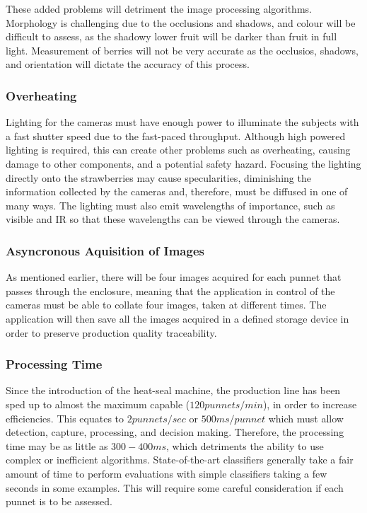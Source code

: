 \documentclass[fleqn,twoside]{article}
\begin{document}
These added problems will detriment the image processing algorithms. Morphology is challenging due to the occlusions and shadows, and colour will be difficult to assess, as the shadowy lower fruit will be darker than fruit in full light. Measurement of berries will not be very accurate as the occlusios, shadows, and orientation will dictate the accuracy of this process.



\subsubsection{Overheating}

Lighting for the cameras must have enough power to illuminate the subjects with a fast shutter speed due to the fast-paced throughput. Although high powered lighting is required, this can create other problems such as overheating, causing damage to other components, and a potential safety hazard. Focusing the lighting directly onto the strawberries may cause specularities, diminishing the information collected by the cameras and, therefore, must be diffused in one of many ways. The lighting must also emit wavelengths of importance, such as visible and IR so that these wavelengths can be viewed through the cameras. 

\subsubsection{Asyncronous Aquisition of Images}

As mentioned earlier, there will be four images acquired for each punnet that passes through the enclosure, meaning that the application in control of the cameras must be able to collate four images, taken at different times. The application will then save all the images acquired in a defined storage device in order to preserve production quality traceability.   

\subsubsection{Processing Time}

Since the introduction of the heat-seal machine, the production line has been sped up to almost the maximum capable ($120 punnets/min$), in order to increase efficiencies. This equates to $2 punnets/sec$ or $500ms/ punnet$ which must allow detection, capture, processing, and decision making. Therefore, the processing time may be as little as $300-400ms$, which detriments the ability to use complex or inefficient algorithms. State-of-the-art classifiers generally take a fair amount of time to perform evaluations with simple classifiers taking a few seconds in some examples. This will require some careful consideration if each punnet is to be assessed.
\end{document}
